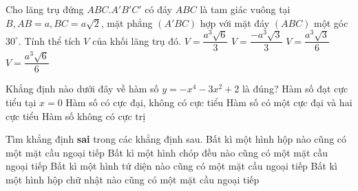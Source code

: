 \begin{ex}%
Cho lăng trụ đứng $ABC.A'B'C'$ có đáy $ABC$ là tam giác vuông tại $B, AB=a,BC=a\sqrt{2}$, mặt phẳng $(A'BC)$ hợp với mặt đáy $(ABC)$ một góc $30^{\circ}$. Tính thể tích $V$ của khối lăng trụ đó.
\choice
{$V=\dfrac{a^3\sqrt{6}}{3}$}
{$V=\dfrac{-a^3\sqrt{3}}{3}$}
{$V=\dfrac{a^3\sqrt{3}}{6}$}
{\True $V=\dfrac{a^3\sqrt{6}}{6}$}
\end{ex}

\begin{ex}%
Khẳng định nào dưới đây về hàm số $y=-x^4-3x^2+2$ là đúng?
\choice
{Hàm số đạt cực tiểu tại $x=0$}
{\True Hàm số có cực đại, không có cực tiểu}
{Hàm số có một cực đại và hai cực tiểu}
{Hàm số không có cực trị}
\end{ex}

\begin{ex}%
Tìm khẳng định \textbf{sai} trong các khẳng định sau.
\choice
{\True Bất kì một hình hộp nào cũng có một mặt cầu ngoại tiếp}
{Bất kì một hình chóp đều nào cũng có một mặt cầu ngoại tiếp}
{Bất kì một hình tứ diện nào cũng có một mặt cầu ngoại tiếp}
{Bất kì một hình hộp chữ nhật nào cũng có một mặt cầu ngoại tiếp}
\end{ex}

